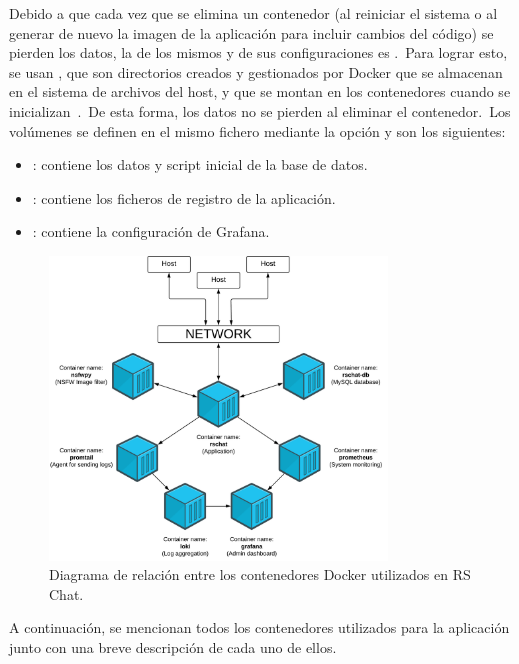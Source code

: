 Debido a que cada vez que se elimina un contenedor (al reiniciar el sistema o al generar de nuevo la imagen de la
aplicación para incluir cambios del código) se pierden los datos, la  de los mismos y de sus
configuraciones es .\ Para lograr esto, se usan , que son directorios creados y
gestionados por Docker que se almacenan en el sistema de archivos del host, y que se montan en los contenedores cuando
se inicializan~\cite{docker-volumes}.\ De esta forma, los datos no se pierden al eliminar el contenedor.\ Los
volúmenes se definen en el mismo fichero  mediante la opción  y son
los siguientes:

\begin{itemize}
	\item {}: contiene los datos y script inicial de la base de datos.
	\item {}: contiene los ficheros de registro de la aplicación.
	\item {}: contiene la configuración de Grafana.
\end{itemize}

\begin{figure}[ht]
	\centering
	\includegraphics[width=0.8\textwidth]{res/images/InfraestructuraDockerRSChat}
	\caption{Diagrama de relación entre los contenedores Docker utilizados en RS Chat.}
	\label{fig:docker-container-diagram}
\end{figure}

A continuación, se mencionan todos los contenedores utilizados para la aplicación junto con una breve descripción de
cada uno de ellos.

